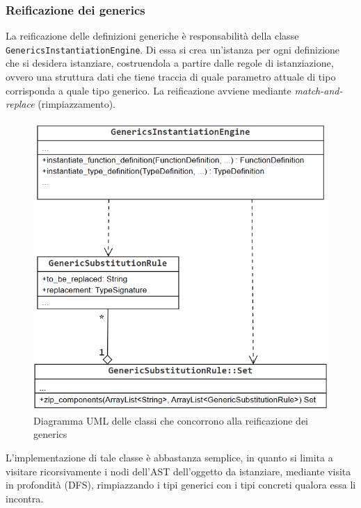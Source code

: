 \subsubsection{Reificazione dei generics}
La reificazione delle definizioni generiche è responsabilità della classe \texttt{GenericsInstantiationEngine}. Di essa 
si crea un'istanza per ogni definizione che si desidera istanziare, costruendola a partire dalle regole di istanziazione, ovvero 
una struttura dati che tiene traccia di quale parametro attuale di tipo corrisponda a quale tipo generico. La reificazione 
avviene mediante \textit{match-and-replace} (rimpiazzamento).  \\

\begin{figure}[H]
    \centering
        \includegraphics[scale=0.7]{../../Assets/GenericsUML.png}
    \caption{Diagramma UML delle classi che concorrono alla reificazione dei generics}
\end{figure}

\newpage

L'implementazione di tale classe è abbastanza semplice, in quanto si limita a visitare ricorsivamente i nodi dell'AST 
dell'oggetto da istanziare, mediante visita in profondità (DFS), rimpiazzando i tipi generici con i tipi concreti 
qualora essa li incontra. \\

